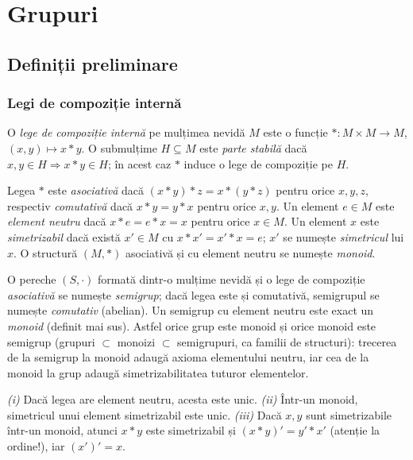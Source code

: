 \chapter{Grupuri}

\section{Definiții preliminare}

\subsection{Legi de compoziție internă}

\begin{definitie}
O \emph{lege de compoziție internă} pe mulțimea nevidă $M$ este o funcție $*:M\times M\to M$, $(x,y)\mapsto x*y$. O submulțime $H\subseteq M$ este \emph{parte stabilă} dacă $x,y\in H\Rightarrow x*y\in H$; în acest caz $*$ induce o lege de compoziție pe $H$.
\end{definitie}

\begin{definitie}
Legea $*$ este \emph{asociativă} dacă $(x*y)*z=x*(y*z)$ pentru orice $x,y,z$, respectiv \emph{comutativă} dacă $x*y=y*x$ pentru orice $x,y$. Un element $e\in M$ este \emph{element neutru} dacă $x*e=e*x=x$ pentru orice $x\in M$. Un element $x$ este \emph{simetrizabil} dacă există $x'\in M$ cu $x*x'=x'*x=e$; $x'$ se numește \emph{simetricul} lui $x$. O structură $(M,*)$ asociativă și cu element neutru se numește \emph{monoid}.
\end{definitie}

\begin{definitie}[semigrup]
O pereche $(S,\cdot)$ formată dintr-o mulțime nevidă și o lege de compoziție \emph{asociativă} se numește \emph{semigrup}; dacă legea este și comutativă, semigrupul se numește \emph{comutativ} (abelian). Un semigrup cu element neutru este exact un \emph{monoid} (definit mai sus). Astfel orice grup este monoid și orice monoid este semigrup (grupuri $\subset$ monoizi $\subset$ semigrupuri, ca familii de structuri): trecerea de la semigrup la monoid adaugă axioma elementului neutru, iar cea de la monoid la grup adaugă simetrizabilitatea tuturor elementelor.
\end{definitie}

\begin{propozitie}[unicitate]\label{prop:unicitate}
\emph{(i)} Dacă legea are element neutru, acesta este unic. \emph{(ii)} Într-un monoid, simetricul unui element simetrizabil este unic. \emph{(iii)} Dacă $x,y$ sunt simetrizabile într-un monoid, atunci $x*y$ este simetrizabil și $(x*y)'=y'*x'$ (atenție la ordine!), iar $(x')'=x$.
\end{propozitie}

